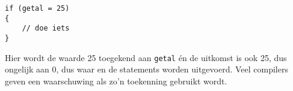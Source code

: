 \hspace*{1em}\texttt{if (getal = 25)}\\
\hspace*{1em}\texttt{\{}\\
\hspace*{1em}\texttt{\ \ \ \ // doe iets}\\
\hspace*{1em}\texttt{\}}

Hier wordt de waarde 25 toegekend aan \texttt{getal} én de uitkomst is ook 25, dus ongelijk aan 0, dus waar en de statements worden uitgevoerd. Veel compilers geven een waarschuwing als zo'n toekenning gebruikt wordt.

